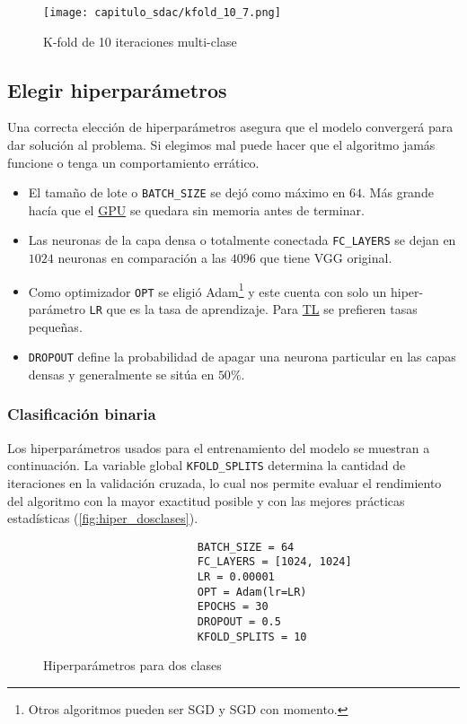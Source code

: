 \begin{figure}[]
    \centering
    \texttt{[image: capitulo\_sdac/kfold\_10\_7.png]}
    \caption{K-fold de 10 iteraciones multi-clase}\label{fig:kfold_7}
\end{figure}

\subsection{Elegir hiperparámetros}

Una correcta elección de hiperparámetros asegura que el modelo convergerá para
dar solución al problema. Si elegimos mal puede hacer que el algoritmo jamás
funcione o tenga un comportamiento errático. 

\begin{itemize}
    \item El tamaño de lote o \texttt{BATCH_SIZE} se dejó como máximo
    en \(64\). Más grande hacía que el \hyperlink{abbr}{GPU} se quedara sin
    memoria antes de terminar.
    \item Las neuronas de la capa densa o totalmente conectada
    \texttt{FC_LAYERS} se dejan en \(1024\) neuronas en comparación a
    las \(4096\) que tiene VGG original.
    \item Como optimizador \texttt{OPT} se eligió Adam\footnote{Otros
    algoritmos pueden ser SGD y SGD con momento.} y este cuenta con solo un
    hiper-parámetro \texttt{LR} que es la tasa de aprendizaje. Para
    \hyperlink{abbr}{TL} se prefieren tasas pequeñas.
    \item \texttt{DROPOUT} define la probabilidad de apagar una
    neurona particular en las capas densas y generalmente se sitúa en \(50\%\).
\end{itemize}

\subsubsection{Clasificación binaria}

Los hiperparámetros usados para el entrenamiento del modelo se muestran a
continuación. La variable global \texttt{KFOLD_SPLITS} determina la
cantidad de iteraciones en la validación cruzada, lo cual nos permite evaluar el
rendimiento del algoritmo con la mayor exactitud posible y con las mejores
prácticas estadísticas (\autoref{fig:hiper_dosclases}).

\begin{figure}[H]
    \centering
    \begin{verbatim}
                        BATCH_SIZE = 64
                        FC_LAYERS = [1024, 1024]
                        LR = 0.00001
                        OPT = Adam(lr=LR)
                        EPOCHS = 30
                        DROPOUT = 0.5
                        KFOLD_SPLITS = 10
    \end{verbatim}
     \caption{Hiperparámetros para dos clases}\label{fig:hiper_dosclases}
\end{figure}

